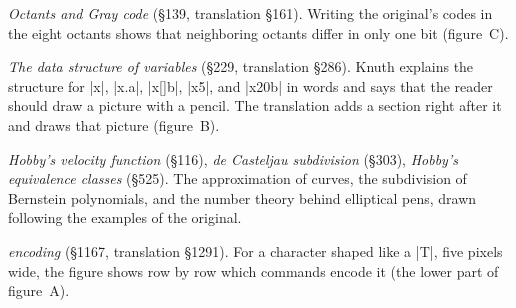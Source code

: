 {\list\raggedright
\item {\it Octants and Gray code\/} (\S139, translation \S161). Writing
the original's codes in the eight octants shows that neighboring
octants differ in only one bit (figure~C).
\item {\it The data structure of variables\/} (\S229, translation
\S286). Knuth explains the structure for |x|, |x.a|, |x[]b|, |x5|,
and |x20b| in words and says that the reader should draw a picture with
a pencil. The translation adds a section right after it and draws that
picture (figure~B).
\item {\it Hobby's velocity function\/} (\S116), {\it de Casteljau
subdivision\/} (\S303), {\it Hobby's equivalence classes\/} (\S525).
The approximation of
curves, the subdivision of Bernstein polynomials, and the number theory
behind elliptical pens, drawn following the examples of the original.
\item {\it{} encoding\/} (\S1167, translation \S1291). For a
character shaped like a |T|, five pixels wide, the figure shows row by
row which commands encode it (the lower part of figure~A).
\endlist

}
